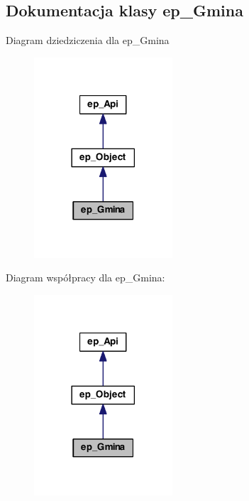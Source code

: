 \hypertarget{classep___gmina}{\subsection{Dokumentacja klasy ep\-\_\-\-Gmina}
\label{classep___gmina}
}


Diagram dziedziczenia dla ep\-\_\-\-Gmina\nopagebreak
\begin{figure}[H]
\begin{center}
\leavevmode
\includegraphics[width=146pt]{classep___gmina__inherit__graph}
\end{center}
\end{figure}


Diagram współpracy dla ep\-\_\-\-Gmina\-:\nopagebreak
\begin{figure}[H]
\begin{center}
\leavevmode
\includegraphics[width=146pt]{classep___gmina__coll__graph}
\end{center}
\end{figure}

